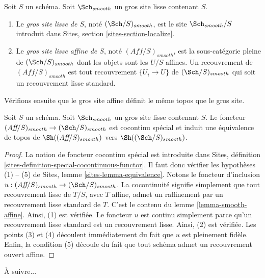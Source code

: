 \begin{definition}
\label{definition-big-small-smooth}
Soit $S$ un schéma. Soit $\Sch_{smooth}$ un gros site
lisse contenant $S$.
\begin{enumerate}
\item Le {\it gros site lisse de $S$}, noté
$(\Sch/S)_{smooth}$, est le site $\Sch_{smooth}/S$
introduit dans Sites, section \ref{sites-section-localize}.
\item Le {\it gros site lisse affine de $S$}, noté
$(\textit{Aff}/S)_{smooth}$, est la sous-catégorie pleine de
$(\Sch/S)_{smooth}$ dont les objets sont les $U/S$ affines.
Un recouvrement de $(\textit{Aff}/S)_{smooth}$ est tout recouvrement
$\{U_i \to U\}$ de $(\Sch/S)_{smooth}$ qui soit un
recouvrement lisse standard.
\end{enumerate}
\end{definition}

\noindent
Vérifions ensuite que le gros site affine définit le même
topos que le gros site.

\begin{lemma}
\label{lemma-affine-big-site-smooth}
Soit $S$ un schéma. Soit $\Sch_{smooth}$ un gros site
lisse contenant $S$.
Le foncteur
$(\textit{Aff}/S)_{smooth} \to (\Sch/S)_{smooth}$
est cocontinu spécial et induit une équivalence de topos de
$\Sh((\textit{Aff}/S)_{smooth})$ vers
$\Sh((\Sch/S)_{smooth})$.
\end{lemma}

\begin{proof}
La notion de foncteur cocontinu spécial est introduite dans
Sites, définition \ref{sites-definition-special-cocontinuous-functor}.
Il faut donc vérifier les hypothèses (1) -- (5) de
Sites, lemme \ref{sites-lemma-equivalence}.
Notons le foncteur d'inclusion
$u : (\textit{Aff}/S)_{smooth} \to (\Sch/S)_{smooth}$.
La cocontinuité signifie simplement que tout recouvrement lisse de
$T/S$, avec $T$ affine, admet un raffinement par un recouvrement lisse standard de $T$.
C'est le contenu du
lemme \ref{lemma-smooth-affine}.
Ainsi, (1) est vérifiée. Le foncteur $u$ est continu simplement parce qu'un recouvrement
lisse standard est un recouvrement lisse. Ainsi, (2) est vérifiée.
Les points (3) et (4) découlent immédiatement du fait que $u$ est
pleinement fidèle. Enfin, la condition (5) découle du
fait que tout schéma admet un recouvrement ouvert affine.
\end{proof}

\noindent
À suivre...


